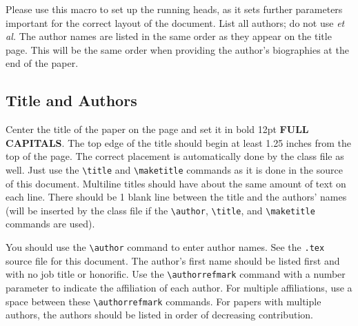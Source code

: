 \documentclass{scspaperproc}
\theoremstyle{scsthe}
\begin{document}
    Please use this macro to set up the running heads, as it sets further parameters important for the correct layout of the document. List all authors; do not use \textit{et al.} The author names are listed in the same order as they appear on the title page. This will be the same order when providing the author's biographies at the end of the paper.


    \subsection{Title and Authors}

    Center the title of the paper on the page and set it in bold 12pt \textbf{\uppercase{full capitals}}. The top edge of the title should begin at least 1.25 inches from the top of the page. The correct placement is automatically done by the class file as well. Just use the \verb+\title+ and \verb+\maketitle+ commands as it is done in the source of this document. Multiline titles should have about the same amount of text on each line. There should be 1 blank line between the title and the authors’ names (will be inserted by the class file if the \verb+\author+, \verb+\title+, and \verb+\maketitle+ commands are used).


    You should use the \verb+\author+ command to enter author names. See the \texttt{.tex} source file for this document. The author’s first name should be listed first and with no job title or honorific. Use the \verb+\authorrefmark+ command with a number parameter to indicate the affiliation of each author. For multiple affiliations, use a space between these \verb+\authorrefmark+ commands. For papers with multiple authors, the authors should be listed in order of decreasing contribution.
\end{document}
